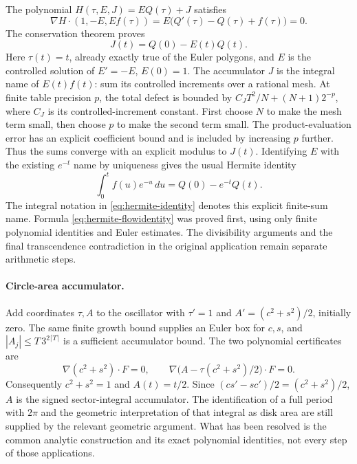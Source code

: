 The polynomial $H(\tau,E,J)=E Q(\tau)+J$ satisfies
\[
 \nabla H\cdot(1,-E,Ef(\tau))
   =E\bigl(Q'(\tau)-Q(\tau)+f(\tau)\bigr)=0.
\]
The conservation theorem proves
\begin{equation}
 J(t)=Q(0)-E(t)Q(t).
 \label{eq:hermite-flowidentity}
\end{equation}
Here $\tau(t)=t$, already exactly true of the Euler polygons, and $E$
is the controlled solution of $E'=-E$, $E(0)=1$.  The accumulator $J$
is the integral name of $E(t)f(t)$: sum its controlled increments over
a rational mesh.  At finite table precision $p$, the total defect is
bounded by $C_JT^2/N+(N+1)2^{-p}$, where $C_J$ is its controlled-increment
constant.  First choose $N$ to make the mesh term small, then choose $p$
to make the second term small.  The product-evaluation error has an
explicit coefficient bound and is included by increasing $p$ further.
Thus the sums converge with an explicit modulus to $J(t)$.
Identifying $E$ with the existing $e^{-t}$ name by uniqueness gives the
usual Hermite identity
\begin{equation}
 \int_0^t f(u)e^{-u}\,du=Q(0)-e^{-t}Q(t).
 \label{eq:hermite-identity}
\end{equation}
The integral notation in \eqref{eq:hermite-identity} denotes this
explicit finite-sum name.  Formula \eqref{eq:hermite-flowidentity} was
proved first, using only finite polynomial identities and Euler estimates.
The divisibility arguments and the final transcendence contradiction in
the original application remain separate arithmetic steps.

\paragraph{Circle-area accumulator.}
Add coordinates $\tau,A$ to the oscillator with
$\tau'=1$ and $A'=(c^2+s^2)/2$, initially zero.  The same finite
growth bound supplies an Euler box for $c,s$, and
$|A_j|\le T\,3^{2\lceil T\rceil}$ is a sufficient accumulator bound.
The two polynomial certificates are
\[
 \nabla(c^2+s^2)\cdot F=0,
 \qquad
 \nabla\bigl(A-\tau(c^2+s^2)/2\bigr)\cdot F=0.
\]
Consequently $c^2+s^2=1$ and $A(t)=t/2$.  Since
$(c s'-s c')/2=(c^2+s^2)/2$, $A$ is the signed sector-integral
accumulator.  The identification of a full period with $2\pi$ and the
geometric interpretation of that integral as disk area are still supplied
by the relevant geometric argument.  What has been resolved is the
common analytic construction and its exact polynomial identities, not
every step of those applications.

